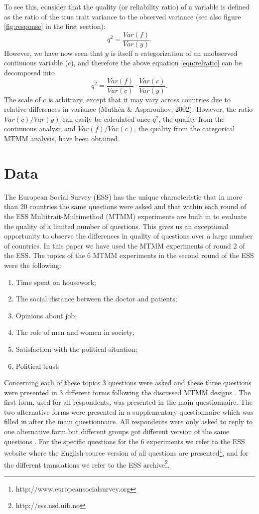\documentclass[a4paper,12pt]{article}
\begin{document}
To see this, consider that the quality (or reliability ratio) of a variable is defined as the ratio of the true trait variance to the observed variance (see also figure \ref{fig:response} in the first section):
\begin{equation}
q^2 = \frac{Var(f)}{Var(y)}.\label{eqn:relratio}
\end{equation}
However, we have now seen that $y$ is itself a categorization of an unobserved continuous variable ($c$), and therefore the above equation \ref{eqn:relratio} can be decomposed into
\begin{equation}
q^2 =  \frac{ Var(f)}{Var(c)} \cdot \frac{Var(c)}{Var(y)}.		
\end{equation}
The scale of $c$ is arbitrary, except that it may vary across countries due to relative differences in variance (Muth\'en \& Asparouhov, 2002). However, the ratio $Var(c)/Var(y)$ can easily be calculated once $q^2$, the quality from the continuous analysi, and $Var(f)/Var(c)$, the quality from the categorical MTMM analysis, have been obtained.

\section{Data}


The European Social Survey (ESS) has the unique characteristic that in more than 20 countries the same questions were asked and that within each round of the ESS Multitrait-Multimethod (MTMM) experiments are built in to evaluate the quality of a limited number of questions. This gives us an exceptional opportunity to observe the differences in quality of questions over a large number of countries. In this paper we have used the MTMM experiments of round 2 of the ESS. The topics of the 6 MTMM experiments in the second round of the ESS were the following:
\begin{enumerate}
\item Time spent on housework;
\item The social distance between the doctor and patients;
\item Opinions about job;
\item The role of men and women in society;
\item Satisfaction with the political situation;
\item Political trust.
\end{enumerate}
Concerning each of these topics 3 questions were asked and these three questions were presented in 3 different forms following the discussed MTMM designs 
\cite{campbell_convergent_1959}. The first form,  used for all respondents, was presented in the main questionnaire. The two alternative forms were presented in a supplementary questionnaire which was filled in after the main questionnaire. All respondents were only asked to reply to one alternative form but different groups got different version of the same questions \cite{saris_new_2004}. For the specific questions for the 6 experiments we refer to the ESS website where the English source version of all questions are presented\footnote{http://www.europeansocialsurvey.org}, and for the different translations we refer to the ESS archive\footnote{http://ess.nsd.uib.no}.
\end{document}
